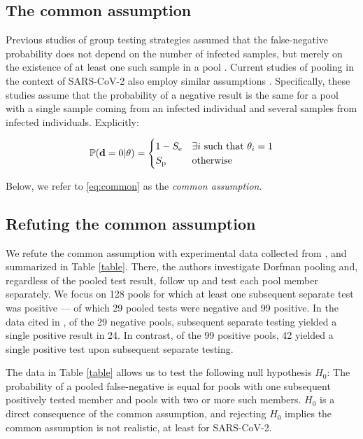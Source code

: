 \documentclass{article}
\begin{document}
\subsection*{The common assumption}\label{subsec:common}
Previous studies of group testing strategies assumed that the
false-negative probability does not depend on the number of infected
samples, but merely on the existence of at least one such sample in a
pool \cite{Kim, OptimalDorfmanPool}. Current studies of pooling in the
context of SARS-CoV-2 also employ similar assumptions
\cite{Simplistic1, Simplistic2}. Specifically, these studies assume
that the probability of a negative result is the same for a pool with
a single sample coming from an infected individual and several
 samples from infected individuals. Explicitly:

\begin{align}\label{eq:common}
  \mathbb{P}(\mathbf{d}=0|\theta) = 
  \begin{cases} 
    1-S_{\text{e}} & \exists i\ \text{such that } \theta_i = 1\\
    S_{\text{p}} & \text{otherwise}
  \end{cases} 
\end{align}

Below, we refer to \eqref{eq:common} as the \emph{common
  assumption}. 

\subsection*{Refuting the common assumption}\label{subsec:refute}
We refute the common assumption with experimental data collected from
\cite{Salazar}, and summarized in Table \ref{table}. There, the
authors investigate Dorfman pooling and, regardless of the pooled test
result, follow up and test each pool member separately. We focus on
128 pools for which at least one subsequent separate test was positive
--- of which 29 pooled tests were negative and 99 positive. In the
data cited in \cite{Salazar}, of the 29 negative pools, subsequent
separate testing yielded a single positive result in 24. In contrast,
of the 99 positive pools, 42 yielded a single positive test upon
subsequent separate testing.

The data in Table \ref{table} allows us to test the following null
hypothesis $H_0$: The probability of a pooled false-negative is equal
for pools with one subsequent positively tested member and pools with
two or more such members. $H_0$ is a direct consequence of the common
assumption, and rejecting $H_0$ implies the common assumption is not
realistic, at least for SARS-CoV-2.
\end{document}
